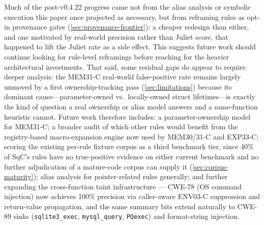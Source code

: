 Much of the post-v0.4.22 progress came not from the alias analysis or
symbolic execution this paper once projected as necessary, but from
reframing rules as opt-in provenance gates (\cref{sec:provenance-frontier}):
a cheaper redesign than either, and one motivated by real-world
precision rather than Juliet score, that happened to lift the Juliet
rate as a side effect.  This suggests future work should continue
looking for rule-level reframings before reaching for the heavier
architectural investments.  That said, some residual gaps do appear to
require deeper analysis: the MEM31-C real-world false-positive rate
remains largely unmoved by a first ownership-tracking pass
(\cref{sec:limitations}) because its dominant cause---parameter-owned
vs.\ locally-owned struct lifetimes---is exactly the kind of question
a real ownership or alias model answers and a same-function heuristic
cannot.  Future work therefore includes: a parameter-ownership model
for MEM31-C; a broader audit of which other rules would benefit from
the registry-based macro-expansion engine now used by MEM30/31-C and
EXP33-C; scoring the existing per-rule fixture corpus as a third
benchmark tier, since 40\% of SqC's rules have no true-positive
evidence on either current benchmark and no further adjudication of a
mature-code corpus can supply it (\cref{sec:corpus-maturity}); alias
analysis for pointer-related rules generally; and
further expanding the cross-function taint infrastructure --- CWE-78
(OS command injection) now achieves 100\% precision via caller-aware
ENV03-C suppression and return-value propagation, and the same summary
bits extend naturally to CWE-89 sinks (\texttt{sqlite3\_exec},
\texttt{mysql\_query}, \texttt{PQexec}) and format-string injection.

